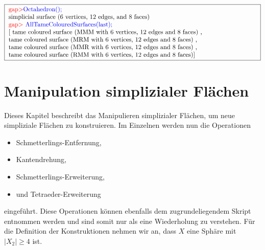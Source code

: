 \documentclass[12pt,titlepage,twoside,cleardoublepage]{article}
\theoremstyle{nummermitklammern}
\numberwithin{equation}{section}
\begin{document}
\begin{center}
$\fbox{
\parbox{14cm}{
\textcolor{red}{gap$>$}\textcolor{blue}{Octahedron();}\newline
simplicial surface (6 vertices, 12 edges, and 8 faces)\newline
\textcolor{red}{gap$>$} \textcolor{blue}{AllTameColouredSurfaces(last);}\newline
[ tame coloured surface (MMM with 6 vertices, 12 edges and 8 faces)
    , \newline
     tame coloured surface (MRM with 6 vertices, 12 edges and 8 faces)
    ,\newline
     tame coloured surface (MMR with 6 vertices, 12 edges and 8 faces)
    ,\newline
  tame coloured surface (RMM with 6 vertices, 12 edges and 8 faces)]
}}
$
\end{center}
\section{Manipulation simplizialer Flächen}\label{manipulation}
Dieses Kapitel beschreibt das Manipulieren simplizialer Flächen, um neue simpliziale Flächen zu konstruieren. Im Einzelnen werden nun die Operationen
\begin{itemize}
\item Schmetterlings-Entfernung,
\item Kantendrehung,
 \item Schmetterlings-Erweiterung,
 \item und Tetraeder-Erweiterung
\end{itemize}
 eingeführt.
Diese Operationen können ebenfalls dem zugrundeliegendem Skript entnommen werden und sind somit nur als eine Wiederholung zu verstehen. Für die Definition der Konstruktionen nehmen wir an, dass $X$ eine Sphäre mit $\vert X_2 \vert \geq 4$ ist.

\end{document}
